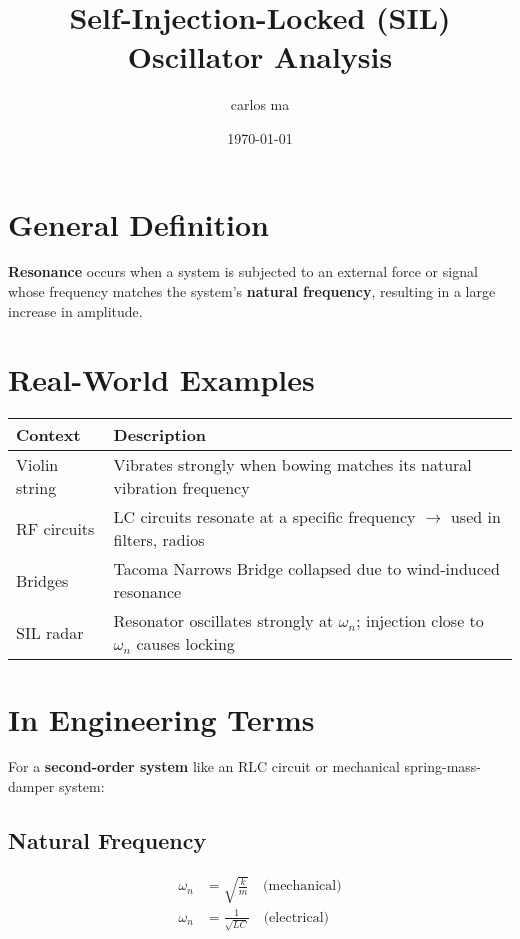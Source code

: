 \documentclass{article}
\title{Self-Injection-Locked (SIL) Oscillator Analysis}
\author{carlos ma}
\date{\today}
\begin{document}
\maketitle

\section{General Definition}

\textbf{Resonance} occurs when a system is subjected to an external force or signal whose frequency matches the system's \textbf{natural frequency}, resulting in a large increase in amplitude.

\section{Real-World Examples}

\begin{center}
\begin{tabular}{>{\centering\arraybackslash}m{3cm} >{\raggedright\arraybackslash}m{9cm}}
\toprule
\textbf{Context} & \textbf{Description} \\
\midrule
Violin string & Vibrates strongly when bowing matches its natural vibration frequency \\
RF circuits & LC circuits resonate at a specific frequency $\rightarrow$ used in filters, radios \\
Bridges & Tacoma Narrows Bridge collapsed due to wind-induced resonance \\
SIL radar & Resonator oscillates strongly at $\omega_n$; injection close to $\omega_n$ causes locking \\
\bottomrule
\end{tabular}
\end{center}

\section{In Engineering Terms}

For a \textbf{second-order system} like an RLC circuit or mechanical spring-mass-damper system:

\subsection{Natural Frequency}
\begin{align}
\omega_n &= \sqrt{\frac{k}{m}} \quad \text{(mechanical)} \\
\omega_n &= \frac{1}{\sqrt{LC}} \quad \text{(electrical)}
\end{align}
\end{document}
